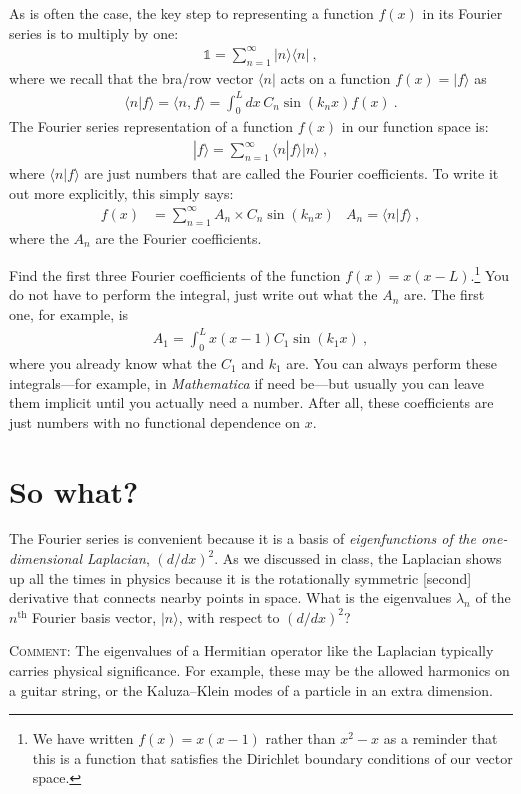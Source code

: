 \documentclass[12pt]{article}
\numberwithin{equation}{section}    %
\begin{document}
As is often the case, the key step to representing a function $f(x)$ in its Fourier series is to multiply by one:
\begin{align}
	\mathbb{1} = \sum_{n=1}^\infty |n\rangle \langle n| \ ,
\end{align}
where we recall that the bra/row vector $\langle n|$ acts on a function $f(x)=|f\rangle$ as
\begin{align}
	\langle n | f\rangle = \langle n, f\rangle = \int_0^L dx\, C_n \sin(k_n x) f(x) \ .
\end{align}
The Fourier series representation of a function $f(x)$ in our function space is:
\begin{align}
	|f\rangle = \sum_{n=1}^\infty \langle n|f\rangle  |n\rangle  \ ,
\end{align}
where $\langle n|f\rangle$ are just numbers that are called the Fourier coefficients. To write it out more explicitly, this simply says:
\begin{align}
	f(x) &= \sum_{n=1}^\infty A_n \times C_n \sin(k_n x) & A_n = \langle n|f\rangle \ ,
	\end{align}
	where the $A_n$ are the Fourier coefficients.

Find the first three Fourier coefficients of the function $f(x) = x(x-L)$.\footnote{We have written $f(x) = x(x-1)$ rather than $x^2-x$ as a reminder that this is a function that satisfies the Dirichlet boundary conditions of our vector space.} You do not have to perform the integral, just write out what the $A_n$ are. The first one, for example, is
\begin{align}
	A_1 = \int_0^L x(x-1) C_1 \sin(k_1 x) \ ,
\end{align}
where you already know what the $C_1$ and $k_1$ are. You can always perform these integrals---for example, in \emph{Mathematica} if need be---but usually you can leave them implicit until you actually need a number. After all, these coefficients are just numbers with no functional dependence on $x$.


\section{So what?}

The Fourier series is convenient because it is a basis of \emph{eigenfunctions of the one-dimensional Laplacian}, $(d/dx)^2$. As we discussed in class, the Laplacian shows up all the times in physics because it is the rotationally symmetric [second] derivative that connects nearby points in space. What is the eigenvalues $\lambda_n$ of the $n^\text{th}$ Fourier basis vector, $|n\rangle$, with respect to $(d/dx)^2$?

\textsc{Comment:} The eigenvalues of a Hermitian operator like the Laplacian typically carries physical significance. For example, these may be the allowed harmonics on a guitar string, or the Kaluza--Klein modes of a particle in an extra dimension. 
\end{document}

